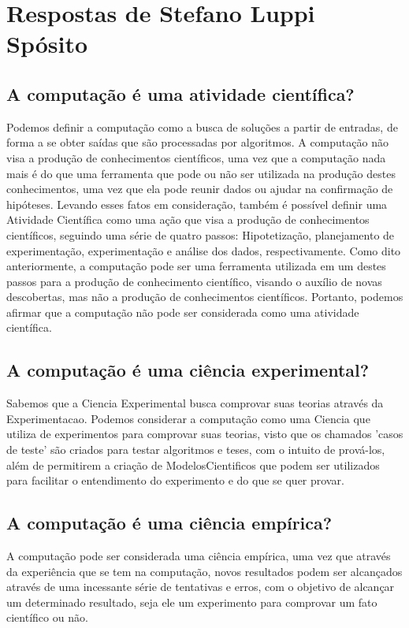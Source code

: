 \section{Respostas de Stefano Luppi Spósito}

\subsection{A computação é uma atividade científica?}
Podemos definir a computação como a busca de soluções a partir de entradas, de forma a se obter saídas que são processadas por algoritmos. A computação não visa a produção de conhecimentos científicos, uma vez que a computação nada mais é do que uma ferramenta que pode ou não ser utilizada na produção destes conhecimentos, uma vez que ela pode reunir dados ou ajudar na confirmação de hipóteses.
Levando esses fatos em consideração, também é possível definir uma Atividade Científica como uma ação que visa a produção de conhecimentos científicos, seguindo uma série de quatro passos: Hipotetização, planejamento de experimentação, experimentação e análise dos dados, respectivamente.
Como dito anteriormente, a computação pode ser uma ferramenta utilizada em um destes passos para a produção de conhecimento científico, visando o auxílio de novas descobertas, mas não a produção de conhecimentos científicos.
Portanto, podemos afirmar que a computação não pode ser considerada como uma atividade científica.
\subsection{A computação é uma ciência experimental?}
Sabemos que a \gls{Ciencia} Experimental busca comprovar suas teorias através da \gls{Experimentacao}. Podemos considerar a computação como uma \gls{Ciencia} que utiliza de experimentos para comprovar suas teorias, visto que os chamados 'casos de teste' são criados para testar algoritmos e teses, com o intuito de prová-los, além de permitirem a criação de \gls{ModelosCientificos} que podem ser utilizados para facilitar o entendimento do experimento e do que se quer provar.
\subsection{A computação é uma ciência empírica?}
A computação pode ser considerada uma ciência empírica, uma vez que através da experiência que se tem na computação, novos resultados podem ser alcançados através de uma incessante série de tentativas e erros, com o objetivo de alcançar um determinado resultado, seja ele um experimento para comprovar um fato científico ou não.